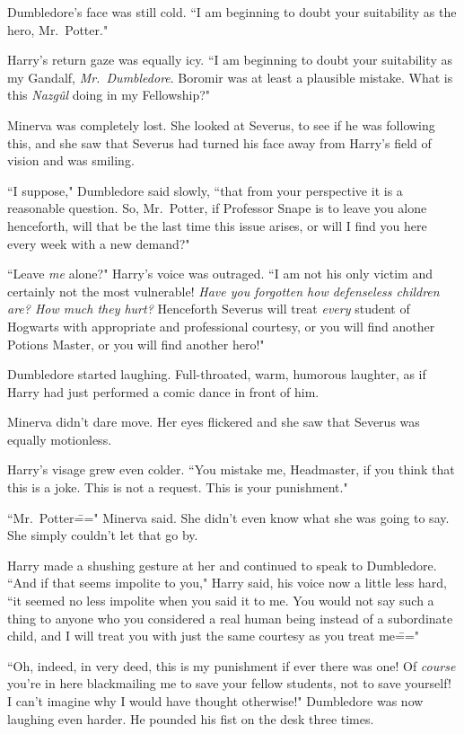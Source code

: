 Dumbledore's face was still cold. ``I am beginning to doubt your suitability as the hero, Mr.~Potter."

Harry's return gaze was equally icy. ``I am beginning to doubt your suitability as my Gandalf, \emph{Mr.~Dumbledore}. Boromir was at least a plausible mistake. What is this \emph{Nazgûl} doing in my Fellowship?"

Minerva was completely lost. She looked at Severus, to see if he was following this, and she saw that Severus had turned his face away from Harry's field of vision and was smiling.

``I suppose," Dumbledore said slowly, ``that from your perspective it is a reasonable question. So, Mr.~Potter, if Professor Snape is to leave you alone henceforth, will that be the last time this issue arises, or will I find you here every week with a new demand?"

``Leave \emph{me} alone?" Harry's voice was outraged. ``I am not his only victim and certainly not the most vulnerable! \emph{Have you forgotten how defenseless children are? How much they hurt?} Henceforth Severus will treat \emph{every} student of Hogwarts with appropriate and professional courtesy, or you will find another Potions Master, or you will find another hero!"

Dumbledore started laughing. Full-throated, warm, humorous laughter, as if Harry had just performed a comic dance in front of him.

Minerva didn't dare move. Her eyes flickered and she saw that Severus was equally motionless.

Harry's visage grew even colder. ``You mistake me, Headmaster, if you think that this is a joke. This is not a request. This is your punishment."

``Mr.~Potter\===" Minerva said. She didn't even know what she was going to say. She simply couldn't let that go by.

Harry made a shushing gesture at her and continued to speak to Dumbledore. ``And if that seems impolite to you," Harry said, his voice now a little less hard, ``it seemed no less impolite when you said it to me. You would not say such a thing to anyone who you considered a real human being instead of a subordinate child, and I will treat you with just the same courtesy as you treat me\==="

``Oh, indeed, in very deed, this is my punishment if ever there was one! Of \emph{course} you're in here blackmailing me to save your fellow students, not to save yourself! I can't imagine why I would have thought otherwise!" Dumbledore was now laughing even harder. He pounded his fist on the desk three times.

